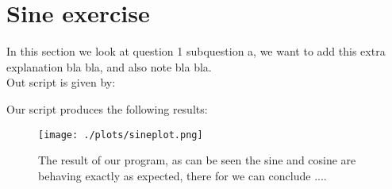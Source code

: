 \section{Sine exercise}

In this section we look at question 1 subquestion a, 
we want to add this extra explanation bla bla, and also 
note bla bla. \\

Out script is given by:


Our script produces the following results:


\begin{figure}[h!]
  \centering
  \texttt{[image: ./plots/sineplot.png]}
  \caption{The result of our program, as can be seen the 
  sine and cosine are behaving exactly as expected, there 
  for we can conclude ....}
\end{figure}